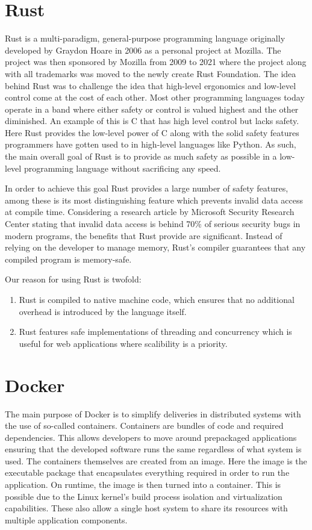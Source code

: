 \section*{Rust}
Rust is a multi-paradigm, general-purpose programming language originally developed by Graydon Hoare in 2006 as a personal project at Mozilla. 
The project was then sponsored by Mozilla from 2009 to 2021 where the project along with all trademarks was moved to the newly create Rust Foundation. 
The idea behind Rust was to challenge the idea that high-level ergonomics and low-level control come at the cost of each other\cite{Rust_Book}.
Most other programming languages today operate in a band where either safety or control is valued highest and the other diminished. An example of this is C that has high level control but lacks safety.
Here Rust provides the low-level power of C along with the solid safety features programmers have gotten used to in high-level languages like Python. 
As such, the main overall goal of Rust is to provide as much safety as possible in a low-level programming language without sacrificing any speed\cite{Rust_in_Action}.

In order to achieve this goal Rust provides a large number of safety features, among these is its most distinguishing feature which prevents invalid data access at compile time. 
Considering a research article by Microsoft Security Research Center stating that invalid data access is behind 70\% of serious security bugs in modern programs, the benefits that Rust provide are significant\cite{Safe_Systems_Languages}. 
Instead of relying on the developer to manage memory, Rust's compiler guarantees that any compiled program is memory-safe.

Our reason for using Rust is twofold: 
\begin{enumerate}
    \item Rust is compiled to native machine code, which ensures that no additional overhead is introduced by the language itself.
    \item Rust features safe implementations of threading and concurrency which is useful for web applications where scalibility is a priority.
\end{enumerate}

\section*{Docker}
The main purpose of Docker is to simplify deliveries in distributed systems with the use of so-called containers\cite{Docker_Container}.
Containers are bundles of code and required dependencies. This allows developers to move around prepackaged applications ensuring that the developed software runs the same regardless of what system is used\cite{Docker_Container}.
The containers themselves are created from an image. Here the image is the executable package that encapsulates everything required in order to run the application. On runtime, the image is then turned into a container. 
This is possible due to the Linux kernel's build process isolation and virtualization capabilities. These also allow a single host system to share its resources with multiple application components\cite{Docker_Container}.

